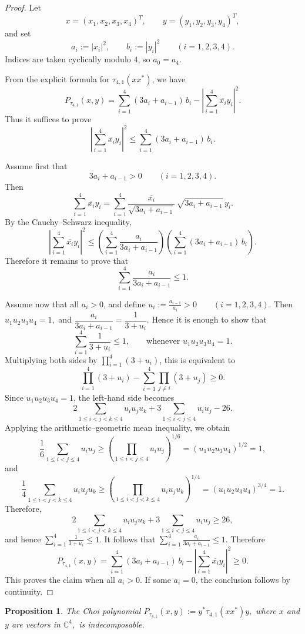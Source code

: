\documentclass[12pt,a4paper]{amsart}
\theoremstyle{plain}
\newtheorem{proposition}[theorem]{Proposition}
\theoremstyle{remark}
\theoremstyle{definition}
\begin{document}
\begin{proof}
Let
\[
x=(x_1,x_2,x_3,x_4)^T,\qquad y=(y_1,y_2,y_3,y_4)^T,
\]
and set
\[
a_i:=|x_i|^2,\qquad b_i:=|y_i|^2
\qquad (i=1,2,3,4).
\]
Indices are taken cyclically modulo $4$, so $a_0=a_4$.

From the explicit formula for $\tau_{4,1}(xx^*)$, we have
\[
P_{\tau_{4,1}}(x,y)
=
\sum_{i=1}^4 (3a_i+a_{i-1})\,b_i
-\left|\sum_{i=1}^4 \overline{x_i}y_i\right|^2.
\]
Thus it suffices to prove
\[
\left|\sum_{i=1}^4 \overline{x_i}y_i\right|^2
\le
\sum_{i=1}^4 (3a_i+a_{i-1})\,b_i.
\]

Assume first that
\[
3a_i+a_{i-1}>0
\qquad (i=1,2,3,4).
\]
Then
\[
\sum_{i=1}^4 \overline{x_i}y_i
=
\sum_{i=1}^4
\frac{\overline{x_i}}{\sqrt{3a_i+a_{i-1}}}\,
\sqrt{3a_i+a_{i-1}}\,y_i.
\]
By the Cauchy--Schwarz inequality,
\[
\left|\sum_{i=1}^4 \overline{x_i}y_i\right|^2
\le
\left(\sum_{i=1}^4 \frac{a_i}{3a_i+a_{i-1}}\right)
\left(\sum_{i=1}^4 (3a_i+a_{i-1})\,b_i\right).
\]
Therefore it remains to prove that
\[
\sum_{i=1}^4 \frac{a_i}{3a_i+a_{i-1}}\le 1.
\]

Assume now that all $a_i>0$, and define
\(\displaystyle
u_i:=\frac{a_{i-1}}{a_i}>0
\qquad (i=1,2,3,4).
\)
Then
\(
u_1u_2u_3u_4=1,
\)
and
\(
\dfrac{a_i}{3a_i+a_{i-1}}=\dfrac{1}{3+u_i}.
\)
Hence it is enough to show that
\[
\sum_{i=1}^4 \frac{1}{3+u_i}\le 1,
\qquad\text{whenever }u_1u_2u_3u_4=1.
\]
Multiplying both sides by $\prod_{i=1}^4(3+u_i)$, this is equivalent to
\[
\prod_{i=1}^4(3+u_i)-\sum_{i=1}^4 \prod_{j\ne i}(3+u_j)\ge 0.
\]
Since $u_1u_2u_3u_4=1$,  the left-hand side becomes
\[
2\sum_{1\le i<j<k\le 4}u_i u_j u_k
+3\sum_{1\le i<j\le 4}u_i u_j
-26.
\]
Applying the arithmetic--geometric mean inequality, we obtain 
\[
\frac{1}{6}\sum_{1\le i<j\le 4}u_i u_j
\ge
\left(\prod_{1\le i<j\le 4}u_i u_j\right)^{1/6}
=
(u_1u_2u_3u_4)^{1/2}=1,
\]
and 
\[
\frac{1}{4}\sum_{1\le i<j<k\le 4}u_i u_j u_k
\ge
\left(\prod_{1\le i<j<k\le 4}u_i u_j u_k\right)^{1/4}
=
(u_1u_2u_3u_4)^{3/4}=1.
\]
Therefore,
\[
2\sum_{1\le i<j<k\le 4}u_i u_j u_k
+3\sum_{1\le i<j\le 4}u_i u_j
\ge 26,
\]
and hence
\(\displaystyle
\sum_{i=1}^4 \frac{1}{3+u_i}\le 1.
\)
It follows that
\(\displaystyle
\sum_{i=1}^4 \frac{a_i}{3a_i+a_{i-1}}\le 1.
\)
Therefore
\[
P_{\tau_{4,1}}(x,y)
=
\sum_{i=1}^4 (3a_i+a_{i-1})\,b_i
-\left|\sum_{i=1}^4 \overline{x_i}y_i\right|^2
\ge 0.
\]
This proves the claim when all $a_i>0$. If some $a_i=0$, the conclusion follows by continuity. 
\end{proof}



\begin{proposition}
The Choi polynomial
$P_{\tau_{4,1}}(x,y) :=y^*\tau_{4,1}(xx^*)y,$
where $x$ and $y$ are vectors in $\mathbb C^4,$
is indecomposable.
\end{proposition}
\end{document}
